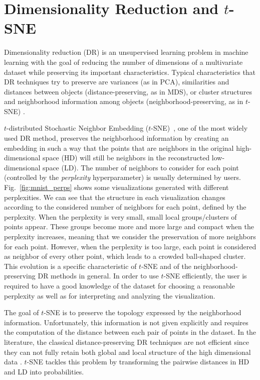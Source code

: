 \section{Dimensionality Reduction and $t$-SNE}\label{sec:background}

Dimensionality reduction (DR) is an unsupervised learning problem in machine learning with the goal of reducing the number of dimensions of a multivariate dataset while preserving its important characteristics. Typical characteristics that DR techniques try to preserve are variances (as in PCA), similarities and distances between objects (distance-preserving, as in MDS), or cluster structures and neighborhood information among objects (neighborhood-preserving, as in $t$-SNE) \cite{lee2007}.

$t$-distributed Stochastic Neighbor Embedding ($t$-SNE)~\cite{maaten2008tsne}, one of the most widely used DR method, preserves the neighborhood information by creating an embedding in such a way that the points that are neighbors in the original high-dimensional space (HD) will still be neighbors in the reconstructed low-dimensional space (LD).
The number of neighbors to consider for each point (controlled by the \emph{perplexity} hyperparameter) is usually determined by users.
Fig.~\ref{fig:mnist_perps} shows some visualizations generated with different perplexities.
We can see that the structure in each visualization changes according to the considered number of neighbors for each point, defined by the perplexity.
When the perplexity is very small, small local groups/clusters of points appear. These groups become more and more large and compact when the perplexity increases, meaning that we consider the preservation of more neighbors for each point.
However, when the perplexity is too large, each point is considered as neighbor of every other point, which leads to a crowded ball-shaped cluster.
This evolution is a specific characteristic of $t$-SNE and of the neighborhood-preserving DR methods in general.
In order to use $t$-SNE efficiently, the user is required to have a good knowledge of the dataset for choosing a reasonable perplexity as well as for interpreting and analyzing the visualization.

The goal of $t$-SNE is to preserve the topology expressed by the neighborhood information.
Unfortunately, this information is not given explicitly and requires the computation of the distance between each pair of points in the dataset. 
In the literature, the classical distance-preserving DR techniques are not efficient since they can not fully retain both global and local structure of the high dimensional data \cite{maaten2008tsne, van2009comparativeReview}.
$t$-SNE tackles this problem by transforming the pairwise distances in HD and LD into probabilities.

